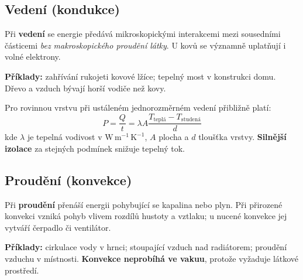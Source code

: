 \documentclass[11pt,a4paper]{article}
\begin{document}
\subsection{Vedení (kondukce)}
Při \textbf{vedení} se energie předává mikroskopickými interakcemi mezi sousedními částicemi \emph{bez makroskopického proudění látky}. U kovů se významně uplatňují i volné elektrony.

\begin{center}
\end{center}
\textbf{Příklady:} zahřívání rukojeti kovové lžíce; tepelný most v konstrukci domu. Dřevo a vzduch bývají horší vodiče než kovy.

Pro rovinnou vrstvu při ustáleném jednorozměrném vedení přibližně platí:
\[
\boxed{P=\frac{Q}{t}=\lambda A\frac{T_{\mathrm{teplá}}-T_{\mathrm{studená}}}{d}}
\]
kde $\lambda$ je tepelná vodivost v $\mathrm{W\,m^{-1}\,K^{-1}}$, $A$ plocha a $d$ tloušťka vrstvy. \textbf{Silnější izolace} za stejných podmínek snižuje tepelný tok.

\subsection{Proudění (konvekce)}
Při \textbf{proudění} přenáší energii pohybující se kapalina nebo plyn. Při přirozené konvekci vzniká pohyb vlivem rozdílů hustoty a vztlaku; u nucené konvekce jej vytváří čerpadlo či ventilátor.

\begin{center}
\end{center}
\textbf{Příklady:} cirkulace vody v hrnci; stoupající vzduch nad radiátorem; proudění vzduchu v místnosti. \textbf{Konvekce neprobíhá ve vakuu}, protože vyžaduje látkové prostředí.
\end{document}
